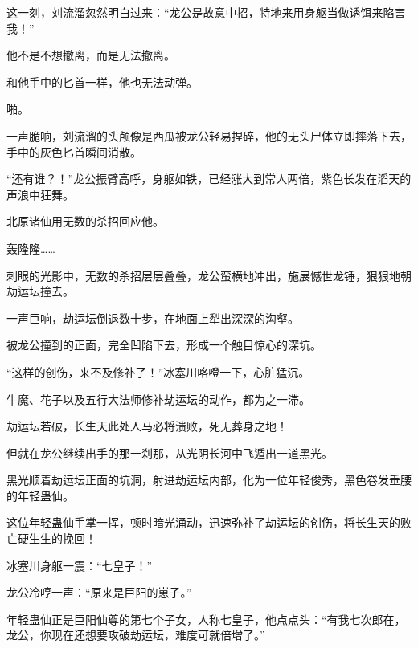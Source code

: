 \begin{this_body}
这一刻，刘流溜忽然明白过来：“龙公是故意中招，特地来用身躯当做诱饵来陷害我！”

他不是不想撤离，而是无法撤离。

和他手中的匕首一样，他也无法动弹。

啪。

一声脆响，刘流溜的头颅像是西瓜被龙公轻易捏碎，他的无头尸体立即摔落下去，手中的灰色匕首瞬间消散。

“还有谁？！”龙公振臂高呼，身躯如铁，已经涨大到常人两倍，紫色长发在滔天的声浪中狂舞。

北原诸仙用无数的杀招回应他。

轰隆隆……

刺眼的光影中，无数的杀招层层叠叠，龙公蛮横地冲出，施展憾世龙锤，狠狠地朝劫运坛撞去。

一声巨响，劫运坛倒退数十步，在地面上犁出深深的沟壑。

被龙公撞到的正面，完全凹陷下去，形成一个触目惊心的深坑。

“这样的创伤，来不及修补了！”冰塞川咯噔一下，心脏猛沉。

牛魔、花子以及五行大法师修补劫运坛的动作，都为之一滞。

劫运坛若破，长生天此处人马必将溃败，死无葬身之地！

但就在龙公继续出手的那一刹那，从光阴长河中飞遁出一道黑光。

黑光顺着劫运坛正面的坑洞，射进劫运坛内部，化为一位年轻俊秀，黑色卷发垂腰的年轻蛊仙。

这位年轻蛊仙手掌一挥，顿时暗光涌动，迅速弥补了劫运坛的创伤，将长生天的败亡硬生生的挽回！

冰塞川身躯一震：“七皇子！”

龙公冷哼一声：“原来是巨阳的崽子。”

年轻蛊仙正是巨阳仙尊的第七个子女，人称七皇子，他点点头：“有我七次郎在，龙公，你现在还想要攻破劫运坛，难度可就倍增了。”

\end{this_body}


